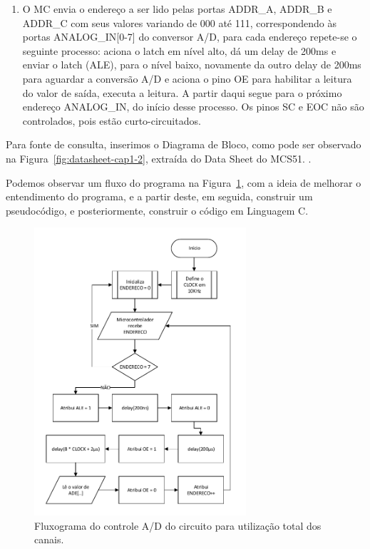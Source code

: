 \documentclass[
	12pt,				%
	openright,			%
  oneside,     %
	a4paper,			%
	english,			%
	french,				%
	spanish,			%
	brazil				%
	]{abntex2}
\begin{document}
\begin{enumerate}
\begin{enumerate}
    \item O MC envia o endereço a ser lido pelas portas ADDR\_A, ADDR\_B e ADDR\_C com seus valores variando de 000 até 111, correspondendo às portas ANALOG\_IN[0-7] do conversor A/D, para cada endereço repete-se o seguinte processo: aciona o latch em nível alto, dá um delay de 200ms e enviar o latch  (ALE), para o nível baixo, novamente da outro delay de 200ms para aguardar a conversão A/D e aciona o pino OE para habilitar a leitura do valor de saída, executa a leitura. A partir daqui segue para o próximo endereço ANALOG\_IN, do início desse processo. Os pinos SC e EOC não são controlados, pois estão curto-circuitados. 
  \end{enumerate}
\end{enumerate}

Para fonte de consulta, inserimos o Diagrama de Bloco, como pode ser observado na Figura~\ref{fig:datasheet-cap1-2}, extraída do Data Sheet do MCS51. \cite{Corporation2000}.

Podemos observar um fluxo do programa na Figura~\ref{fig:cha-1-fluxograma}, com a ideia de melhorar o entendimento do programa, e a partir deste, em seguida, construir um pseudocódigo, e posteriormente, construir o código em Linguagem C.

\begin{figure}[H]
  \centering  
  \caption{\label{fig:cha-1-fluxograma}Fluxograma do controle A/D do circuito para utilização total dos canais.}
  \includegraphics[width=0.7\textwidth]{images/Atividade01/Fluxograma.pdf}
\end{figure}
\end{document}
